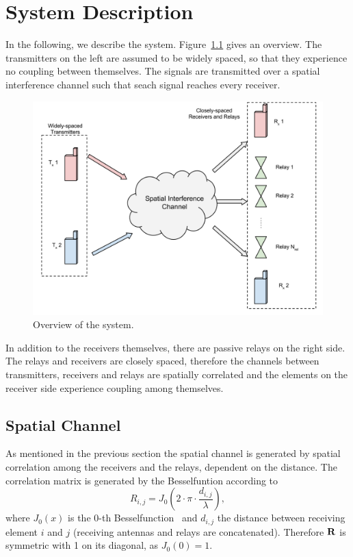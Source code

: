 \chapter{System Description}
\label{sec:system}

In the following, we describe the system.
Figure~\ref{fig:system} gives an overview.
The transmitters on the left are assumed to be widely spaced, so that they experience no coupling between themselves.
The signals are transmitted over a spatial interference channel such that seach signal reaches every receiver.
\begin{figure}[h]
\begin{center}
\includegraphics[width=\textwidth]{images/System.png}
\caption{Overview of the system.}
\label{fig:system}
\end{center}
\end{figure}

In addition to the receivers themselves, there are passive relays on the right side.
The relays and  receivers are closely spaced, therefore the channels between transmitters, receivers and relays are spatially correlated and the elements on the receiver side experience coupling among themselves.

\section{Spatial Channel}
\label{sec:spatial}

As mentioned in the previous section the spatial channel is generated by spatial correlation among the receivers and the relays, dependent on the distance.
The correlation matrix is generated by the Besselfuntion according to
\begin{equation}
\label{eq:spatial_corr}
R_{i,j} = J_0\left(2\cdot \pi\cdot \frac{d_{i,j}}{\lambda}\right),
\end{equation}
where $J_0(x)$ is the 0-th Besselfunction~\cite[p.191]{Kreyszig} and $d_{i,j}$ the distance between receiving element $i$ and $j$ (receiving antennas and relays are concatenated).
Therefore $\mathbf{R}$ is symmetric with 1 on its diagonal, as $J_0(0)=1$.

